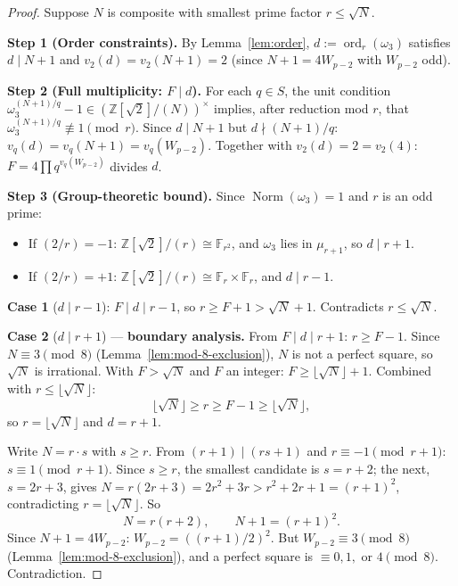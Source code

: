 \documentclass[12pt]{article}
\theoremstyle{plain}
\theoremstyle{definition}
\theoremstyle{remark}
\begin{document}
\begin{proof}
Suppose \(N\) is composite with smallest prime factor
\(r \leq \sqrt{N}\).

\textbf{Step 1 (Order constraints).} By Lemma~\ref{lem:order},
\(d := \operatorname{ord}_r(\omega_3)\) satisfies \(d \mid N+1\) and
\(v_2(d) = v_2(N+1) = 2\) (since \(N+1 = 4W_{p-2}\) with \(W_{p-2}\)
odd).

\textbf{Step 2 (Full multiplicity: \(F \mid d\)).} For each \(q \in S\),
the unit condition \(\omega_3^{(N+1)/q} - 1 \in
(\mathbb{Z}[\sqrt{2}]/(N))^{\times}\) implies, after reduction mod
\(r\), that \(\omega_3^{(N+1)/q} \not\equiv 1 \pmod{r}\). Since
\(d \mid N+1\) but \(d \nmid (N+1)/q\):
\(v_q(d) = v_q(N+1) = v_q(W_{p-2})\).
Together with \(v_2(d) = 2 = v_2(4)\):
\(F = 4 \prod q^{v_q(W_{p-2})}\) divides \(d\).

\textbf{Step 3 (Group-theoretic bound).} Since
\(\operatorname{Norm}(\omega_3) = 1\)
and \(r\) is an odd prime:
\begin{itemize}
\item If \((2/r) = -1\): \(\mathbb{Z}[\sqrt{2}]/(r) \cong \mathbb{F}_{r^2}\),
  and \(\omega_3\) lies in \(\mu_{r+1}\), so \(d \mid r+1\).
\item If \((2/r) = +1\): \(\mathbb{Z}[\sqrt{2}]/(r) \cong
  \mathbb{F}_r \times \mathbb{F}_r\), and \(d \mid r-1\).
\end{itemize}

\textbf{Case 1} (\(d \mid r-1\)): \(F \mid d \mid r-1\), so
\(r \geq F + 1 > \sqrt{N} + 1\). Contradicts \(r \leq \sqrt{N}\).

\textbf{Case 2} (\(d \mid r+1\)) --- \textbf{boundary analysis.} From
\(F \mid d \mid r+1\): \(r \geq F - 1\). Since
\(N \equiv 3 \pmod{8}\) (Lemma~\ref{lem:mod-8-exclusion}), \(N\) is not a perfect square, so
\(\sqrt{N}\) is irrational. With \(F > \sqrt{N}\) and \(F\) an integer:
\(F \geq \lfloor\sqrt{N}\rfloor + 1\). Combined with
\(r \leq \lfloor\sqrt{N}\rfloor\):
\[
\lfloor\sqrt{N}\rfloor \geq r \geq F - 1 \geq \lfloor\sqrt{N}\rfloor,
\]
so \(r = \lfloor\sqrt{N}\rfloor\) and \(d = r + 1\).

Write \(N = r \cdot s\) with \(s \geq r\). From
\((r+1) \mid (rs + 1)\) and \(r \equiv -1 \pmod{r+1}\):
\(s \equiv 1 \pmod{r+1}\).
Since \(s \geq r\), the smallest candidate is \(s = r + 2\);
the next, \(s = 2r+3\), gives
\(N = r(2r+3) = 2r^2 + 3r > r^2 + 2r + 1 = (r+1)^2\),
contradicting \(r = \lfloor\sqrt{N}\rfloor\). So
\[
N = r(r+2), \qquad N + 1 = (r+1)^2.
\]
Since \(N + 1 = 4W_{p-2}\): \(W_{p-2} = ((r+1)/2)^2\). But
\(W_{p-2} \equiv 3 \pmod{8}\) (Lemma~\ref{lem:mod-8-exclusion}), and a perfect square is
\(\equiv 0, 1,\) or \(4 \pmod{8}\). Contradiction.
\end{proof}
\end{document}
